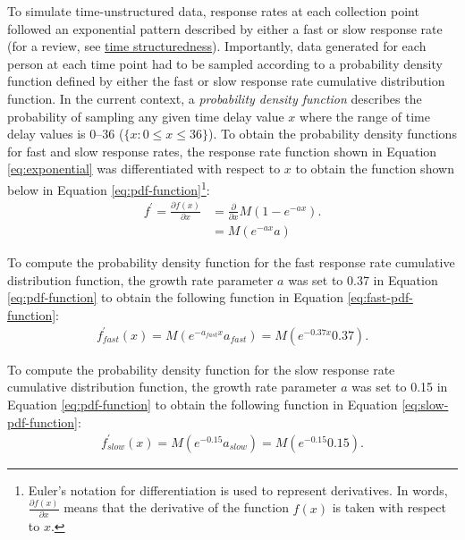 \documentclass[
12pt, %
twoside,
english]{guelphthesis}
\theoremstyle{definition}
\theoremstyle{definition}
\theoremstyle{definition}
\theoremstyle{definition}
\theoremstyle{remark}
\begin{document}
To simulate time-unstructured data, response rates at each collection
point followed an exponential pattern described by either a fast or slow
response rate (for a review, see \protect\hyperlink{time-structuredness}{time structuredness}). Importantly, data generated
for each person at each time point had to be sampled according to a
probability density function defined by either the fast or slow response
rate cumulative distribution function. In the current context, a
\emph{probability density function} describes the probability of sampling
any given time delay value \(x\) where the range of time delay values is
0--36 (\(\{x : 0 \le x \le 36 \}\)). To obtain the probability density functions
for fast and slow response rates, the response rate function shown in
Equation \eqref{eq:exponential} was differentiated with respect to \(x\) to
obtain the function shown below in Equation \ref{eq:pdf-function}\footnote{Euler's notation for differentiation is used to represent derivatives. In words, $\frac{\partial f(x)}{\partial x}$ means that the derivative of the function $f(x)$ is taken with respect to $x$.}:
\begin{align}
f^\prime = \frac{\partial f(x)}{\partial x} &= \frac{\partial}{\partial x}M(1 - e^{-ax}). \nonumber \\
&= M (e^{-ax}a)
\label{eq:pdf-function}
\end {align}

\noindent To compute the probability density function for the fast
response rate cumulative distribution function, the growth rate
parameter \(a\) was set to 0.37 in Equation \ref{eq:pdf-function} to
obtain the following function in Equation \ref{eq:fast-pdf-function}:
\begin{align}
f^\prime_{fast}(x) = M (e^{-a_{fast}x}a_{fast}) = M (e^{-0.37x}0.37). 
\label{eq:fast-pdf-function}
\end {align}

\noindent To compute the probability density function for the slow
response rate cumulative distribution function, the growth rate
parameter \(a\) was set to 0.15 in Equation \ref{eq:pdf-function} to
obtain the following function in Equation \ref{eq:slow-pdf-function}:
\begin{align}
f^\prime_{slow}(x) = M (e^{-0.15}a_{slow}) = M (e^{-0.15}0.15). 
\label{eq:slow-pdf-function}
\end {align}
\end{document}
